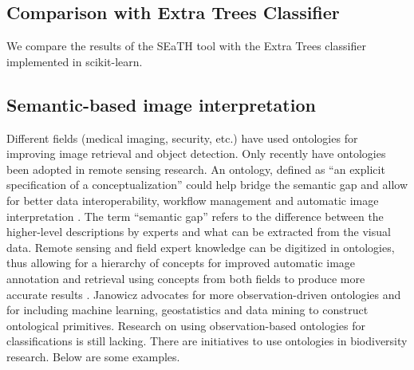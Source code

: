 \documentclass[a4paper,12pt]{article}
\begin{document}
\subsection{Comparison with Extra Trees Classifier}
We compare the results of the SEaTH tool with the Extra Trees classifier
implemented in scikit-learn\cite{scikit-learn}.

\subsection{Semantic-based image interpretation}
Different fields (medical imaging, security, etc.) have used ontologies for
improving image retrieval and object detection. Only recently have ontologies
been adopted in remote sensing research. An ontology, defined as ``an explicit
specification of a conceptualization'' \cite{gruber1993} could help bridge the
semantic gap and allow for better data interoperability, workflow management and
automatic image interpretation \cite{Arvor2013} \cite{Andres2013a}. The term
``semantic gap'' refers to the difference between the higher-level descriptions
by experts and what can be extracted from the visual data. Remote sensing and
field expert knowledge can be digitized in ontologies, thus allowing for a
hierarchy of concepts for improved automatic image annotation and retrieval
using concepts from both fields to produce more accurate results
\cite{Srikanth:2005:EOA:1076034.1076128}. Janowicz \cite{Janowicz2012}
advocates for more observation-driven ontologies and for including machine
learning, geostatistics and data mining to construct ontological primitives.
Research on using observation-based ontologies for classifications is still
lacking. There are initiatives to use ontologies in biodiversity research. Below
are some examples.
\end{document}
